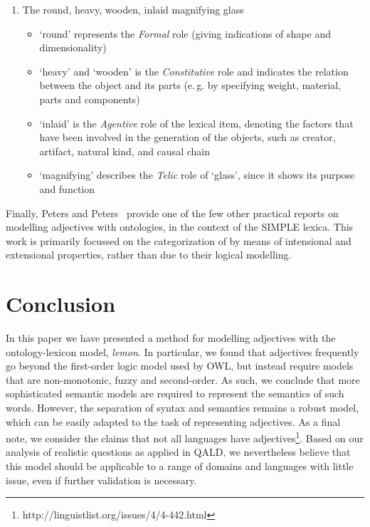 \documentclass[11pt]{article}
\begin{document}
\begin{enumerate}
\item The round, heavy, wooden, inlaid magnifying glass \label{ex:qualia}
\begin{itemize}[noitemsep]
\item `round' represents the \textit{Formal} role (giving indications of shape and dimensionality)
\item `heavy' and `wooden' is the \textit{Constitutive} role and indicates the relation between the object and its parts (e.\,g. by specifying weight, material, parts and components)
\item `inlaid' is the \textit{Agentive} role of the lexical item, denoting the factors that have been involved in the generation of the objects, such as creator, artifact, natural kind, and causal chain
\item `magnifying' describes the \textit{Telic} role of `glass', since it shows its purpose and function
\end{itemize}
\end{enumerate}

Finally, Peters and Peters~ provide one of the few other practical reports on modelling adjectives with ontologies, in the context of the SIMPLE lexica. This work is primarily focussed on the categorization of by means of intensional and extensional properties, rather than due to their logical modelling. 

\section{Conclusion}

In this paper we have presented a method for modelling adjectives with the
ontology-lexicon model, \emph{lemon}. In particular, we found that adjectives
frequently go beyond the first-order logic model used by OWL, but instead 
require models that are non-monotonic, fuzzy and second-order. As such, we 
conclude that more sophisticated semantic models are required to represent the semantics
of such words. However, the separation of syntax and semantics remains a robust
model, which can be easily adapted to the task of representing adjectives. As 
a final note, we consider the claims that not all languages have adjectives\footnote{http://linguistlist.org/issues/4/4-442.html}. Based on our analysis of realistic
questions as applied in QALD, we nevertheless believe that this model should be applicable
to a range of domains and languages with little issue, even if further 
validation is necessary.




\end{document}
